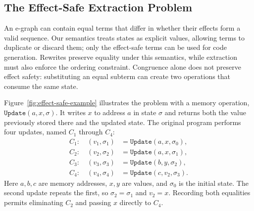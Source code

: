\subsection{The Effect-Safe Extraction Problem}
\label{sec:effect-safe-problem}

An e-graph can contain equal terms that differ in whether their effects form a valid sequence.
Our semantics treats states as explicit values, allowing terms to duplicate or discard them;
  only the effect-safe terms can be used for code generation.
Rewrites preserve equality under this semantics,
  while extraction must also enforce the ordering constraint.
Congruence alone does not preserve effect safety:
  substituting an equal subterm can create two operations that consume the same state.

Figure~\ref{fig:effect-safe-example} illustrates the problem with a memory operation,
  $\mathtt{Update}(a,x,\sigma)$.
It writes $x$ to address $a$ in state $\sigma$ and returns
  both the value previously stored there and the updated state.
The original program performs four updates, named $C_1$ through $C_4$:
\[
  \begin{aligned}
    C_1:\quad (v_1,\sigma_1)&=\mathtt{Update}(a,x,\sigma_0),\\
    C_2:\quad (v_2,\sigma_2)&=\mathtt{Update}(a,x,\sigma_1),\\
    C_3:\quad (v_3,\sigma_3)&=\mathtt{Update}(b,y,\sigma_2),\\
    C_4:\quad (v_4,\sigma_4)&=\mathtt{Update}(c,v_2,\sigma_3).
  \end{aligned}
\]
Here $a,b,c$ are memory addresses, $x,y$ are values, and $\sigma_0$ is the initial state.
The second update repeats the first, so $\sigma_2=\sigma_1$ and $v_2=x$.
Recording both equalities permits eliminating $C_2$ and passing $x$ directly to $C_4$.

